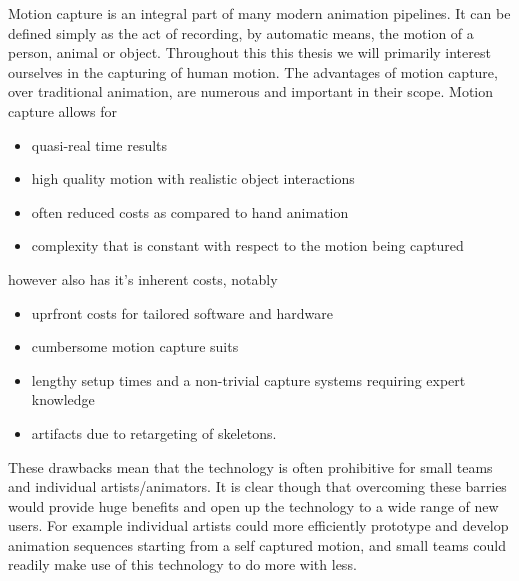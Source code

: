Motion capture is an integral part of many modern animation pipelines. It can be defined simply as the act of recording, by automatic means, the motion of a person, animal or object. Throughout this this thesis we will primarily interest ourselves in the capturing of human motion. The advantages of motion capture, over traditional animation, are numerous and important in their scope. Motion capture allows for
\begin{itemize}
    \item quasi-real time results
    \item high quality motion with realistic object interactions
    \item often reduced costs as compared to hand animation
    \item complexity that is constant with respect to the motion being captured
\end{itemize}
however also has it's inherent costs, notably
\begin{itemize}
    \item uprfront costs for tailored software and hardware
    \item cumbersome motion capture suits 
    \item lengthy setup times and a non-trivial capture systems requiring expert knowledge
    \item artifacts due to retargeting of skeletons.
\end{itemize}
These drawbacks mean that the technology is often prohibitive for small teams and individual artists/animators. It is clear though that overcoming these barries would provide huge benefits and open up the technology to a wide range of new users. For example individual artists could more efficiently prototype and develop animation sequences starting from a self captured motion, and small teams could readily make use of this technology to do more with less.

